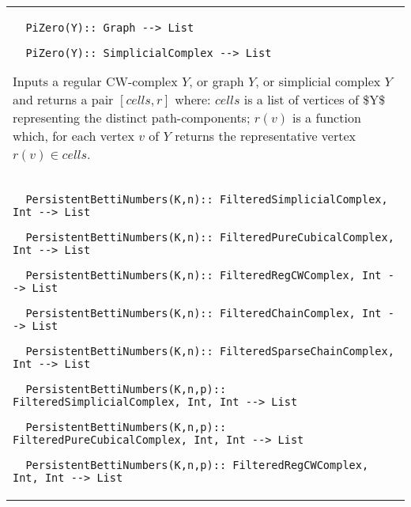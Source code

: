 \documentclass[a4paper,11pt]{report}
\begin{document}
{\begin{center}
\begin{tabular}{|l|}
\begin{verbatim}  PiZero(Y):: Graph --> List
\end{verbatim}
 
\begin{verbatim}  PiZero(Y):: SimplicialComplex --> List
\end{verbatim}


 

 Inputs a regular CW-complex $Y$, or graph $Y$, or simplicial complex $Y$ and returns a pair $[cells,r]$ where: $cells$ is a list of vertices of \$Y\$ representing the distinct path-components; $r(v)$ is a function which, for each vertex $v$ of $Y$ returns the representative vertex $r(v) \in cells$. \\
 \index{PersistentBettiNumbers} 
\begin{verbatim}  PersistentBettiNumbers(K,n):: FilteredSimplicialComplex, Int --> List
\end{verbatim}
 
\begin{verbatim}  PersistentBettiNumbers(K,n):: FilteredPureCubicalComplex, Int --> List
\end{verbatim}
 
\begin{verbatim}  PersistentBettiNumbers(K,n):: FilteredRegCWComplex, Int --> List
\end{verbatim}
 
\begin{verbatim}  PersistentBettiNumbers(K,n):: FilteredChainComplex, Int --> List
\end{verbatim}
 
\begin{verbatim}  PersistentBettiNumbers(K,n):: FilteredSparseChainComplex, Int --> List
\end{verbatim}
 
\begin{verbatim}  PersistentBettiNumbers(K,n,p):: FilteredSimplicialComplex, Int, Int --> List
\end{verbatim}
 
\begin{verbatim}  PersistentBettiNumbers(K,n,p):: FilteredPureCubicalComplex, Int, Int --> List
\end{verbatim}
 
\begin{verbatim}  PersistentBettiNumbers(K,n,p):: FilteredRegCWComplex, Int, Int --> List
\end{verbatim}
 

\end{tabular}
\end{center}}
\end{document}
